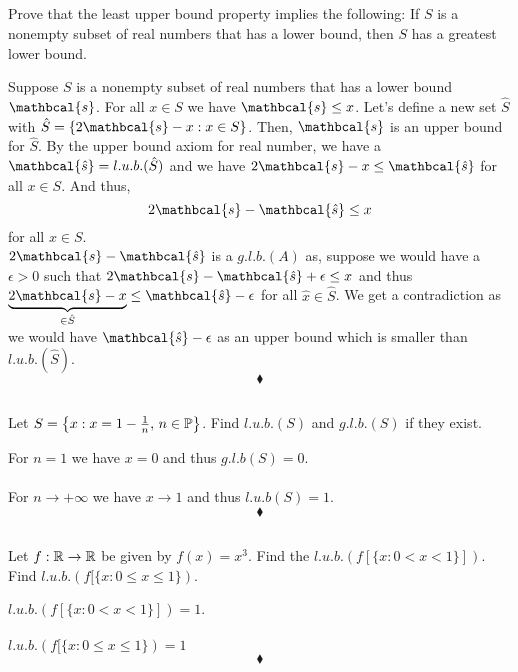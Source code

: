 \subsection{}
\begin{tcolorbox}
Prove that the least upper bound property implies the following: If $S$ is a nonempty subset of real numbers that has a lower bound, then $S$ has a greatest lower bound. 
\end{tcolorbox}
Suppose $S$ is a nonempty subset of real numbers that has a lower bound $\mathbcal{s}$. For all $x\in S$ we have $\mathbcal{s}\leq x$. Let's define a new set $\hat{S}$ with $\hat{S}=\{2\mathbcal{s}-x: x\in S\}$. Then, $\mathbcal{s}$ is an upper bound for $\hat{S}$. By the upper bound axiom for real number, we have a $\mathbcal{\hat{s}}= l.u.b.(\hat{S})$ and we have $2\mathbcal{s}-x\leq \mathbcal{\hat{s}}$ for all $x\in S$. And thus, $$2\mathbcal{s}- \mathbcal{\hat{s}}\leq x$$
for all $x\in S$.\\
$2\mathbcal{s}- \mathbcal{\hat{s}}$ is a $g.l.b.(A)$ as, suppose we would have a $\epsilon>0$ such that  $2\mathbcal{s}- \mathbcal{\hat{s}}+\epsilon \leq x$ and thus $\underbrace{2\mathbcal{s}-x}_{\in\hat{S}} \leq \mathbcal{\hat{s}}-\epsilon$ for all $\hat{x}\in \hat{S}$. We get a contradiction as we would have $\mathbcal{\hat{s}}-\epsilon$ as an upper bound which is smaller than $l.u.b.(\hat{S})$.
$$\blacklozenge$$

\subsection{}
\begin{tcolorbox}
Let $S = \left\{x:x=1-\frac{1}{n},\, n\in\mathbb{P}\right\}$. Find $l.u.b. (S)$ and $g.l.b. (S)$ if they exist. 
\end{tcolorbox}
$$ $$ 
For $n=1$ we have $x=0$ and thus $g.l.b(S)=0$.\\\\
For $n\rightarrow +\infty $ we have $x\rightarrow 1$ and thus $l.u.b(S)=1$.
$$\blacklozenge$$

\subsection{}
\begin{tcolorbox}
Let $f:\mathbb{R}\rightarrow \mathbb{R}$  be given by $f (x)=x^3$. Find the $l.u.b. (f [\{x: 0 < x < 1\}])$. \\
Find $l.u.b. (f [\{x:0\leq x\leq 1\})$. 
\end{tcolorbox}
$$ $$ 
$l.u.b. (f [\{x: 0 < x < 1\}])= 1$.\\\\
$l.u.b. (f [\{x:0\leq x\leq 1\})= 1$
$$\blacklozenge$$

